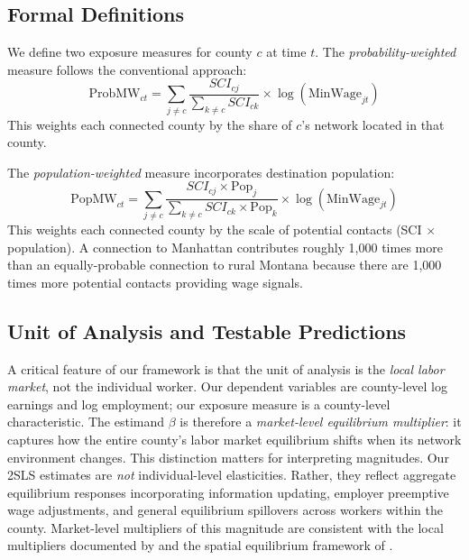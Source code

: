 \documentclass[12pt]{article}
\begin{document}
\subsection{Formal Definitions}

We define two exposure measures for county $c$ at time $t$. The \textit{probability-weighted} measure follows the conventional approach:
\begin{equation}
\text{ProbMW}_{ct} = \sum_{j \neq c} \frac{SCI_{cj}}{\sum_{k \neq c} SCI_{ck}} \times \log(\text{MinWage}_{jt})
\end{equation}
This weights each connected county by the share of $c$'s network located in that county.

The \textit{population-weighted} measure incorporates destination population:
\begin{equation}
\text{PopMW}_{ct} = \sum_{j \neq c} \frac{SCI_{cj} \times \text{Pop}_j}{\sum_{k \neq c} SCI_{ck} \times \text{Pop}_k} \times \log(\text{MinWage}_{jt})
\end{equation}
This weights each connected county by the scale of potential contacts (SCI $\times$ population). A connection to Manhattan contributes roughly 1,000 times more than an equally-probable connection to rural Montana because there are 1,000 times more potential contacts providing wage signals.

\subsection{Unit of Analysis and Testable Predictions}

A critical feature of our framework is that the unit of analysis is the \textit{local labor market}, not the individual worker. Our dependent variables are county-level log earnings and log employment; our exposure measure is a county-level characteristic. The estimand $\beta$ is therefore a \textit{market-level equilibrium multiplier}: it captures how the entire county's labor market equilibrium shifts when its network environment changes. This distinction matters for interpreting magnitudes. Our 2SLS estimates are \textit{not} individual-level elasticities. Rather, they reflect aggregate equilibrium responses incorporating information updating, employer preemptive wage adjustments, and general equilibrium spillovers across workers within the county. Market-level multipliers of this magnitude are consistent with the local multipliers documented by \citet{moretti2011local} and the spatial equilibrium framework of \citet{roback1982wages}.
\end{document}
